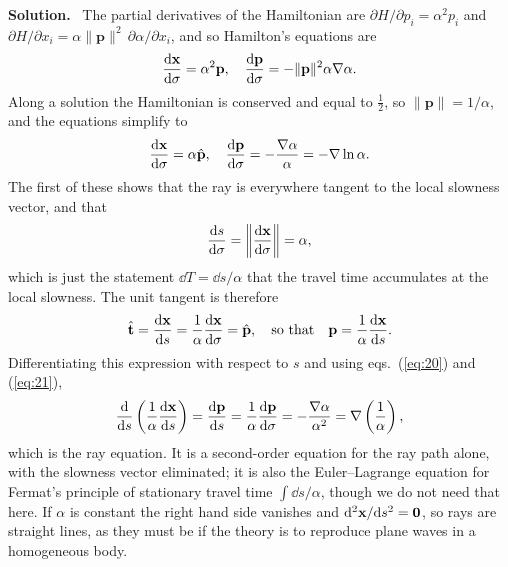 \documentclass[a4paper,12pt]{paper}
\newenvironment{solution}{\par\noindent\textbf{Solution.}\ }{\par\medskip}
\begin{document}
\begin{solution}
The partial derivatives of the Hamiltonian are $\partial H/\partial p_{i}=\alpha^{2}p_{i}$
and $\partial H/\partial x_{i}=\alpha\|\mathbf{p}\|^{2}\,\partial\alpha/\partial x_{i}$, and so
Hamilton's equations are
\begin{equation}
\frac{\mathrm{d}\mathbf{x}}{\mathrm{d}\sigma}=\alpha^{2}\mathbf{p},\quad
\frac{\mathrm{d}\mathbf{p}}{\mathrm{d}\sigma}=-\|\mathbf{p}\|^{2}\alpha\nabla\alpha.
\label{eq:19}
\end{equation}
Along a solution the Hamiltonian is conserved and equal to $\frac{1}{2}$, so $\|\mathbf{p}\|=1/\alpha$,
and the equations simplify to
\begin{equation}
\frac{\mathrm{d}\mathbf{x}}{\mathrm{d}\sigma}=\alpha\hat{\mathbf{p}},\quad
\frac{\mathrm{d}\mathbf{p}}{\mathrm{d}\sigma}=-\frac{\nabla\alpha}{\alpha}=-\nabla\ln\alpha.
\label{eq:20}
\end{equation}
The first of these shows that the ray is everywhere tangent to the local slowness vector, and that
\begin{equation}
\frac{\mathrm{d} s}{\mathrm{d}\sigma}=\left\|\frac{\mathrm{d}\mathbf{x}}{\mathrm{d}\sigma}\right\|=\alpha,
\label{eq:21}
\end{equation}
which is just the statement $\dd T=\dd s/\alpha$ that the travel time accumulates at the local
slowness. The unit tangent is therefore
\begin{equation}
\hat{\mathbf{t}}=\frac{\mathrm{d}\mathbf{x}}{\mathrm{d} s}=\frac{1}{\alpha}\frac{\mathrm{d}\mathbf{x}}{\mathrm{d}\sigma}=\hat{\mathbf{p}},
\quad\text{so that}\quad \mathbf{p}=\frac{1}{\alpha}\frac{\mathrm{d}\mathbf{x}}{\mathrm{d} s}.
\label{eq:22}
\end{equation}
Differentiating this expression with respect to $s$ and using eqs.~(\ref{eq:20}) and (\ref{eq:21}),
\begin{equation}
\frac{\mathrm{d}}{\mathrm{d} s}\left(\frac{1}{\alpha}\frac{\mathrm{d}\mathbf{x}}{\mathrm{d} s}\right)
=\frac{\mathrm{d}\mathbf{p}}{\mathrm{d} s}=\frac{1}{\alpha}\frac{\mathrm{d}\mathbf{p}}{\mathrm{d}\sigma}
=-\frac{\nabla\alpha}{\alpha^{2}}=\nabla\left(\frac{1}{\alpha}\right),
\label{eq:23}
\end{equation}
which is the ray equation. It is a second-order equation for the ray path alone, with the slowness
vector eliminated; it is also the Euler--Lagrange equation for Fermat's principle of stationary
travel time $\int\dd s/\alpha$, though we do not need that here. If $\alpha$ is constant the
right hand side vanishes and $\mathrm{d}^{2}\mathbf{x}/\mathrm{d} s^{2}=\mathbf{0}$, so rays are straight
lines, as they must be if the theory is to reproduce plane waves in a homogeneous body.


\end{solution}
\end{document}
